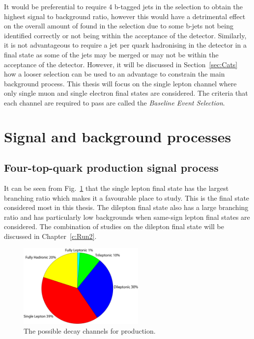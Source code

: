 It would be preferential to require 4 b-tagged jets in the selection to obtain the highest signal to background ratio, however this would have a detrimental effect on the overall amount of \tttt found in the selection due to some b-jets not being identified correctly or not being within the acceptance of the detector. Similarly, it is not advantageous to require a jet per quark hadronising in the detector in a \tttt final state as some of the jets may be merged or may not be within the acceptance of the detector. However, it will be discussed in Section~\ref{sec:Cats} how a looser selection can be used to an advantage to constrain the main background process.
This thesis will focus on the single lepton channel where only single muon and single electron final states are considered. 
The criteria that each channel are required to pass are called the \emph{Baseline Event Selection}.

\section{Signal and background processes}
\label{sec:sigback}

\subsection{Four-top-quark production signal process}
It can be seen from Fig.~\ref{fig:ttttDecay} that the single lepton final state has the largest branching ratio which makes it a favourable place to study. This is the final state considered most in this thesis. The dilepton final state also has a large branching ratio and has particularly low backgrounds when same-sign lepton final states are considered. The combination of studies on the dilepton final state will be discussed in Chapter~\ref{c:Run2}.

\begin{figure}[ht!]
\centering
    \includegraphics[width=0.55\textwidth]{images/Analysis/FourTopBR.pdf}
    \caption{The possible decay channels for \tttt production.}
    \label{fig:ttttDecay}
\end{figure}

